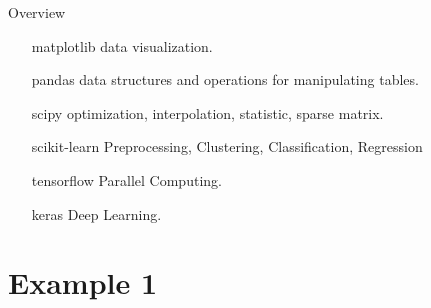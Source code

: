 \documentclass{beamer}
\begin{document}
\begin{frame}{Overview}
\begin{minipage}{0.5\textwidth}
\begin{itemize}
		\item[matplotlib] data visualization.
		\item[pandas] data structures and operations for manipulating tables.
		\item[scipy] optimization, interpolation, statistic, sparse matrix.
		\item[scikit-learn] Preprocessing, Clustering, Classification, Regression
		\item[tensorflow] Parallel Computing.
		\item[keras] Deep Learning. 
	\end{itemize}
\end{minipage}
\end{frame}


\section{Example 1}
\end{document}
